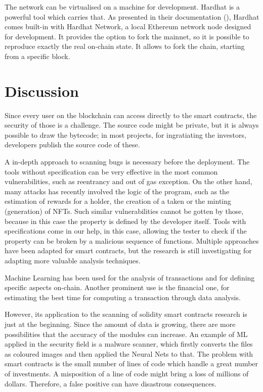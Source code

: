 \documentclass[a4paper,sigconf, language=french,
language=german, language=spanish, language=english]{acmart}
\begin{document}
The network can be virtualised on a machine for development. Hardhat is a powerful tool which carries that. As presented in their documentation (\cite{HardhatDoc}), Hardhat comes built-in with Hardhat Network, a local Ethereum network node designed for development. It provides the option to fork the mainnet, so it is possible to reproduce exactly the real on-chain state. It allows to fork the chain, starting from a specific block.


\section{Discussion}
\label{Discussion}

Since every user on the blockchain can access directly to the smart contracts, the security of those is a challenge. The source code might be private, but it is always possible to draw the bytecode; in most projects, for ingratiating the investors, developers publish the source code of these.  

A in-depth approach to scanning bugs is necessary before the deployment. The tools without specification can be very effective in the most common vulnerabilities, such as reentrancy and out of gas exception. On the other hand, many attacks has recently involved the logic of the program, such as the estimation of rewards for a holder, the creation of a taken or the minting (generation) of NFTs. Such similar vulnerabilities cannot be gotten by those, because in this case the property is defined by the developer itself. Tools with specifications come in our help, in this case, allowing the tester to check if the property can be broken by a malicious sequence of functions. Multiple approaches have been adapted for smart contracts, but the research is still investigating for adapting more valuable analysis techniques.

Machine Learning has been used for the analysis of transactions and for defining specific aspects on-chain. Another prominent use is the financial one, for estimating the best time for computing a transaction through data analysis. 

However, its application to the scanning of solidity smart contracts research is just at the beginning. Since the amount of data is growing, there are more possibilities that the accuracy of the modules can increase.  An example of ML applied in the security field is a malware scanner, which firstly converts the files as coloured images and then applied the Neural Nets to that. The problem with smart contracts is the small number of lines of code which handle a great number of investments. A misposition of a line of code might bring a loss of millions of dollars. Therefore, a false positive can have disastrous consequences.
\end{document}
